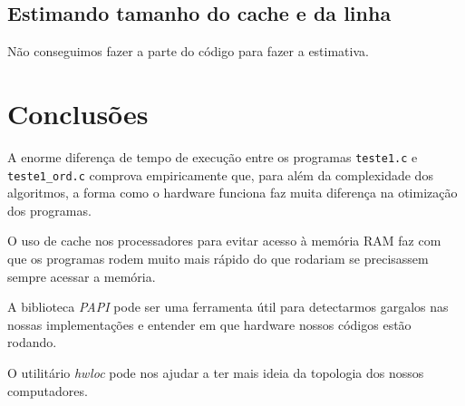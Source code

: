 \documentclass[a4paper,oneside,12pt]{article}
\begin{document}
\subsection{Estimando tamanho do cache e da linha}

Não conseguimos fazer a parte do código para fazer a estimativa.

\section{Conclusões}

A enorme diferença de tempo de execução entre os programas {\tt teste1.c} e {\tt teste1\_ord.c} comprova empiricamente que, para além da complexidade dos algoritmos, a forma como o hardware funciona faz muita diferença na otimização dos programas.

O uso de cache nos processadores para evitar acesso à memória RAM faz com que os programas rodem muito mais rápido do que rodariam se precisassem sempre acessar a memória.

A biblioteca \emph{PAPI} pode ser uma ferramenta útil para detectarmos gargalos nas nossas implementações e entender em que hardware nossos códigos estão rodando.

O utilitário \emph{hwloc} pode nos ajudar a ter mais ideia da topologia dos nossos computadores.
\end{document}

